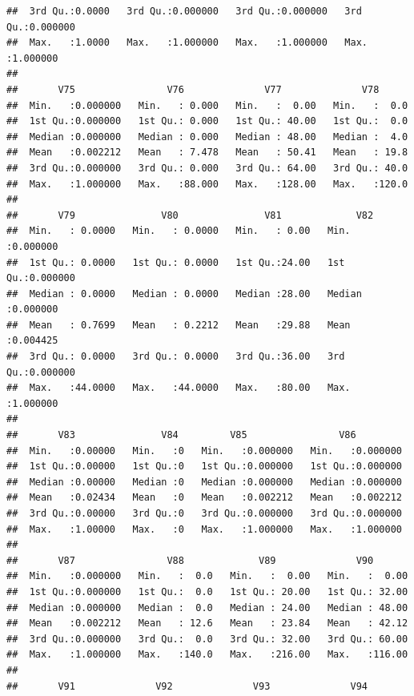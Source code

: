 \documentclass[
]{article}
\begin{document}
\begin{verbatim}
##  3rd Qu.:0.0000   3rd Qu.:0.000000   3rd Qu.:0.000000   3rd Qu.:0.000000  
##  Max.   :1.0000   Max.   :1.000000   Max.   :1.000000   Max.   :1.000000  
##                                                                           
##       V75                V76              V77              V78       
##  Min.   :0.000000   Min.   : 0.000   Min.   :  0.00   Min.   :  0.0  
##  1st Qu.:0.000000   1st Qu.: 0.000   1st Qu.: 40.00   1st Qu.:  0.0  
##  Median :0.000000   Median : 0.000   Median : 48.00   Median :  4.0  
##  Mean   :0.002212   Mean   : 7.478   Mean   : 50.41   Mean   : 19.8  
##  3rd Qu.:0.000000   3rd Qu.: 0.000   3rd Qu.: 64.00   3rd Qu.: 40.0  
##  Max.   :1.000000   Max.   :88.000   Max.   :128.00   Max.   :120.0  
##                                                                      
##       V79               V80               V81             V82          
##  Min.   : 0.0000   Min.   : 0.0000   Min.   : 0.00   Min.   :0.000000  
##  1st Qu.: 0.0000   1st Qu.: 0.0000   1st Qu.:24.00   1st Qu.:0.000000  
##  Median : 0.0000   Median : 0.0000   Median :28.00   Median :0.000000  
##  Mean   : 0.7699   Mean   : 0.2212   Mean   :29.88   Mean   :0.004425  
##  3rd Qu.: 0.0000   3rd Qu.: 0.0000   3rd Qu.:36.00   3rd Qu.:0.000000  
##  Max.   :44.0000   Max.   :44.0000   Max.   :80.00   Max.   :1.000000  
##                                                                        
##       V83               V84         V85                V86          
##  Min.   :0.00000   Min.   :0   Min.   :0.000000   Min.   :0.000000  
##  1st Qu.:0.00000   1st Qu.:0   1st Qu.:0.000000   1st Qu.:0.000000  
##  Median :0.00000   Median :0   Median :0.000000   Median :0.000000  
##  Mean   :0.02434   Mean   :0   Mean   :0.002212   Mean   :0.002212  
##  3rd Qu.:0.00000   3rd Qu.:0   3rd Qu.:0.000000   3rd Qu.:0.000000  
##  Max.   :1.00000   Max.   :0   Max.   :1.000000   Max.   :1.000000  
##                                                                     
##       V87                V88             V89              V90        
##  Min.   :0.000000   Min.   :  0.0   Min.   :  0.00   Min.   :  0.00  
##  1st Qu.:0.000000   1st Qu.:  0.0   1st Qu.: 20.00   1st Qu.: 32.00  
##  Median :0.000000   Median :  0.0   Median : 24.00   Median : 48.00  
##  Mean   :0.002212   Mean   : 12.6   Mean   : 23.84   Mean   : 42.12  
##  3rd Qu.:0.000000   3rd Qu.:  0.0   3rd Qu.: 32.00   3rd Qu.: 60.00  
##  Max.   :1.000000   Max.   :140.0   Max.   :216.00   Max.   :116.00  
##                                                                      
##       V91              V92              V93              V94          

\end{verbatim}
\end{document}

